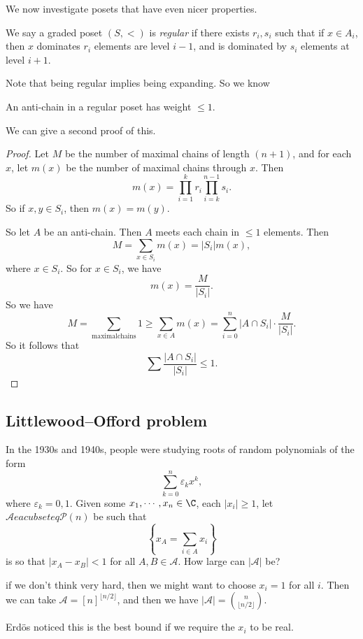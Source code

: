 \documentclass[a4paper]{article}
\begin{document}
We now investigate posets that have even nicer properties.
\begin{defi}
  We say a graded poset $(S, <)$ is \emph{regular} if there exists $r_i, s_i$ such that if $x \in A_i$, then $x$ dominates $r_i$ elements are level $i - 1$, and is dominated by $s_i$ elements at level $i + 1$.
\end{defi}
Note that being regular implies being expanding. So we know

\begin{cor}
  An anti-chain in a regular poset has weight $\leq 1$.
\end{cor}

We can give a second proof of this.
\begin{proof}
  Let $M$ be the number of maximal chains of length $(n + 1)$, and for each $x$, let $m(x)$ be the number of maximal chains through $x$. Then
  \[
    m(x) = \prod_{i = 1}^k r_i \prod_{i = k}^{n - 1} s_i.
  \]
  So if $x, y \in S_i$, then $m(x) = m(y)$.

  So let $A$ be an anti-chain. Then $A$ meets each chain in $\leq 1$ elements. Then
  \[
    M = \sum_{x \in S_i} m(x) = |S_i| m(x),
  \]
  where $x \in S_i$. So for $x \in S_i$, we have
  \[
    m(x) = \frac{M}{|S_i|}.
  \]
  So we have
  \[
    M = \sum_{\mathrm{maximal chains}} 1 \geq \sum_{x \in A} m(x) = \sum_{i = 0}^n |A \cap S_i| \cdot \frac{M}{|S_i|}.
  \]
  So it follows that
  \[
    \sum \frac{|A \cap S_i|}{|S_i|} \leq 1.
  \]
\end{proof}

\subsection{Littlewood--Offord problem}
In the 1930s and 1940s, people were studying roots of random polynomials of the form
\[
  \sum_{k = 0}^n \varepsilon_k x^k,
\]
where $\varepsilon_k = 0, 1$. Given some $x_1, \cdots, x_n \in \C$, each $|x_i| \geq 1$, let $\mathcal{A}eacubseteq \mathcal{P}(n)$ be such that
\[
  \left\{x_A = \sum_{i \in A} x_i \right\}
\]
is so that $|x_A - x_B| < 1$ for all $A, B \in \mathcal{A}$. How large can $|\mathcal{A}|$ be?

if we don't think very hard, then we might want to choose $x_i = 1$ for all $i$. Then we can take $\mathcal{A} = [n]^{\lfloor n/2\rfloor}$, and then we have $|\mathcal{A}| = \binom{n}{\lfloor n/2\rfloor}$.

Erd\"os noticed this is the best bound if we require the $x_i$ to be real.
\end{document}
